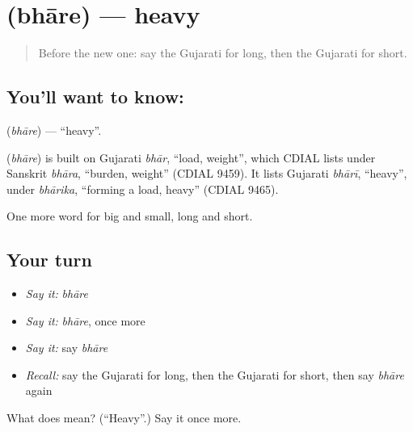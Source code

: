 \section[\texorpdfstring{\gu{ભારે} (bhāre)}{ભારે (bhāre)}]{ (bhāre) — heavy}

\label{lesson:GU-C72-heavy}



\begin{quote}
Before the new one: say the Gujarati for long, then the Gujarati for short.
\end{quote}

\subsection*{You'll want to know: }
\textbf{} (\emph{bhāre}) — \textquotedblleft{}heavy\textquotedblright{}.

\begin{cousinweb}
\textbf{} (\emph{bhāre}) is built on Gujarati \emph{bhār}, \textquotedblleft{}load, weight\textquotedblright{}, which CDIAL lists under Sanskrit \emph{bhāra}, \textquotedblleft{}burden, weight\textquotedblright{} (CDIAL 9459). It lists Gujarati \emph{bhārī}, \textquotedblleft{}heavy\textquotedblright{}, under \emph{bhārika}, \textquotedblleft{}forming a load, heavy\textquotedblright{} (CDIAL 9465).
\end{cousinweb}

\begin{grammarlens}[title={What you've built}]
One more word for big and small, long and short.
\end{grammarlens}

\subsection*{Your turn}
\begin{itemize}
\raggedright
  \item \emph{Say it:} \emph{bhāre}
  \item \emph{Say it:} \emph{bhāre}, once more
  \item \emph{Say it:} say \emph{bhāre}
  \item \emph{Recall:} say the Gujarati for long, then the Gujarati for short, then say \emph{bhāre} again
\end{itemize}

\begin{tcolorbox}[breakable,colback=teal!4,colframe=teal!35!black,title={Before you move on}]
What does  mean? (\textquotedblleft{}Heavy\textquotedblright{}.) Say it once more.
\end{tcolorbox}
